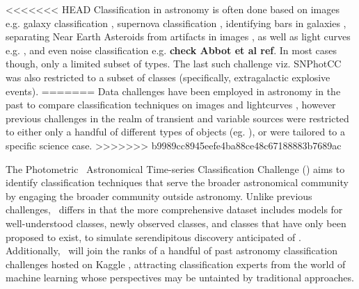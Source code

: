 <<<<<<< HEAD
Classification in astronomy is often done based on images e.g.
galaxy classification \cite{2016A&C....16...34H}, supernova
classification \cite{2017ApJ...836...97C}, identifying bars in galaxies
\cite{2018MNRAS.477..894A}, separating Near Earth Asteroids from artifacts in images
\cite{2016PASJ...68..104M}, as well as light curves e.g. \cite{2016PASJ...68..104M,2017arXiv170906257M,2017CQGra..34f4003Z}, and even noise classification e.g. \textbf{check Abbot et al ref}\cite{2017CQGra..34f4003Z,2018PhRvD..97j1501G}. In most cases though, only a limited subset of types. The last such challenge viz. SNPhotCC was also restricted to a subset of classes (specifically, extragalactic explosive events).
=======
Data challenges have been employed in astronomy in the past to compare classification techniques on images  and lightcurves , however previous challenges in the realm of transient and variable sources were restricted to either only a handful of different types of objects (eg. \snphotcc), or were tailored to a specific science case.
>>>>>>> b9989cc8945eefe4ba88ce48c67188883b7689ac

The Photometric \lsst\ Astronomical Time-series Classification Challenge (\plasticc) aims to identify classification techniques that serve the broader astronomical community by engaging the broader community outside astronomy.
Unlike previous challenges, \plasticc\ differs in that the more comprehensive dataset includes models for well-understood classes, newly observed classes, and classes that have only been proposed to exist, to simulate serendipitous discovery anticipated of \lsst.
Additionally, \plasticc\ will join the ranks of a handful of past astronomy classification challenges hosted on Kaggle , attracting classification experts from the world of machine learning whose perspectives may be untainted by traditional approaches.


